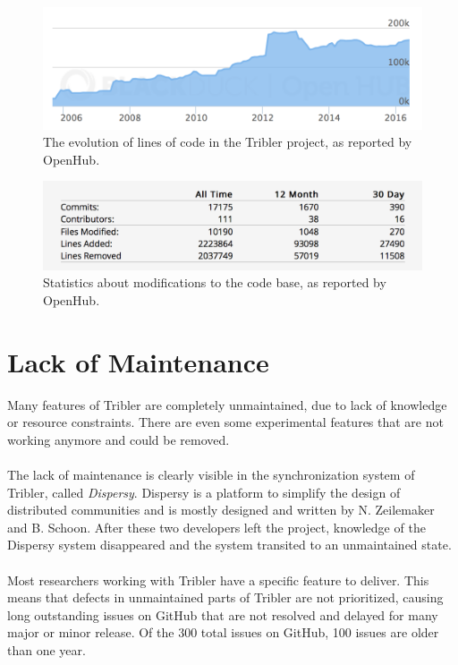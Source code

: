 \begin{figure}[!h]
	\centering
	\includegraphics[width=\columnwidth]{images/openhub_loc}
	\caption{The evolution of lines of code in the Tribler project, as reported by OpenHub.}
	\label{fig:openhub-loc}
\end{figure}

\begin{figure}[!h]
	\centering
	\includegraphics[width=0.6\columnwidth]{images/openhub_commits_table}
	\caption{Statistics about modifications to the code base, as reported by OpenHub.}
	\label{fig:openhub-commit-stats}
\end{figure}

\section{Lack of Maintenance}
Many features of Tribler are completely unmaintained, due to lack of knowledge or resource constraints. There are even some experimental features that are not working anymore and could be removed.\\\\
The lack of maintenance is clearly visible in the synchronization system of Tribler, called \emph{Dispersy}. Dispersy is a platform to simplify the design of distributed communities and is mostly designed and written by
N. Zeilemaker and B. Schoon\cite{zeilemaker2013dispersy}. After these two developers left the project, knowledge of the Dispersy system disappeared and the system transited to an unmaintained state.\\\\
Most researchers working with Tribler have a specific feature to deliver. This means that defects in unmaintained parts of Tribler are not prioritized, causing long outstanding issues on GitHub that are not resolved and delayed for many major or minor release. Of the 300 total issues on GitHub, 100 issues are older than one year.
 
